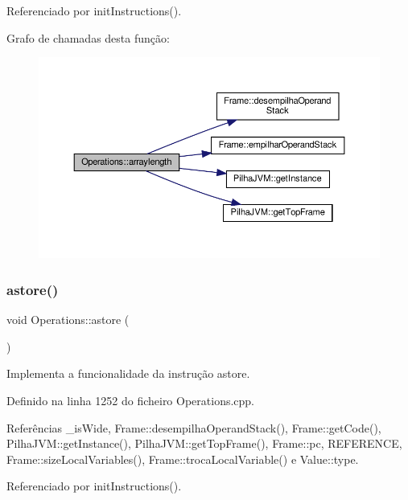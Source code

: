 Referenciado por init\+Instructions().

Grafo de chamadas desta função\+:
\nopagebreak
\begin{figure}[H]
\begin{center}
\leavevmode
\includegraphics[width=350pt]{classOperations_ae01c8bce2d6a583151dc0e46d1b8d52f_cgraph}
\end{center}
\end{figure}
\mbox{\label{classOperations_aa414424bd203fb9788712fd2e74c3a32}} 
\subsubsection{\texorpdfstring{astore()}{astore()}}
{\footnotesize\ttfamily void Operations\+::astore (\begin{DoxyParamCaption}{ }\end{DoxyParamCaption})\hspace{0.3cm}{\ttfamily [private]}}



Implementa a funcionalidade da instrução astore. 



Definido na linha 1252 do ficheiro Operations.\+cpp.



Referências \+\_\+is\+Wide, Frame\+::desempilha\+Operand\+Stack(), Frame\+::get\+Code(), Pilha\+J\+V\+M\+::get\+Instance(), Pilha\+J\+V\+M\+::get\+Top\+Frame(), Frame\+::pc, R\+E\+F\+E\+R\+E\+N\+CE, Frame\+::size\+Local\+Variables(), Frame\+::troca\+Local\+Variable() e Value\+::type.



Referenciado por init\+Instructions().

